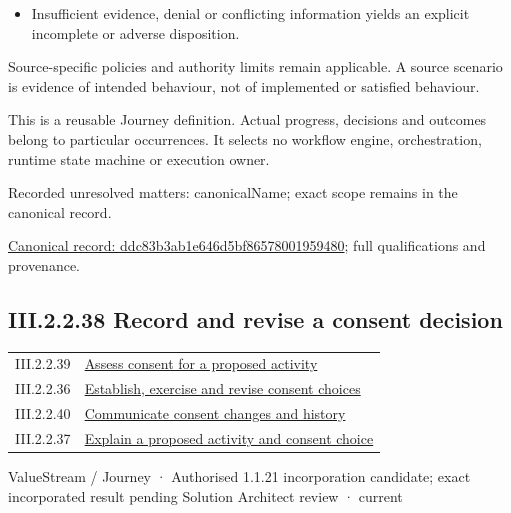 \begin{itemize}


\item Insufficient evidence, denial or conflicting information yields an explicit incomplete or adverse disposition.

\end{itemize}


Source-specific policies and authority limits remain applicable. A source scenario is evidence of intended behaviour, not of implemented or satisfied behaviour.



This is a reusable Journey definition. Actual progress, decisions and outcomes belong to particular occurrences. It selects no workflow engine, orchestration, runtime state machine or execution owner.


{\small Recorded unresolved matters: canonicalName; exact scope remains in the canonical record.}\par
{\footnotesize \href{../../../../../../../continuum/strategy/value-stream/ddc83b3ab1e646d5bf86578001959480.md}{Canonical record: ddc83b3ab1e646d5bf86578001959480}; full qualifications and provenance.}\par
\subsection*{III.2.2.38 Record and revise a consent decision}
\label{navigation:III.2.2.38}

\begin{longtable}{p{.22\linewidth}p{.73\linewidth}}
III.2.2.39 & \hyperref[element:17c66eb17d6040d09e250e787be71719]{Assess consent for a proposed activity} \\
III.2.2.36 & \hyperref[element:850bba32295c4e53b20036b80f77f491]{Establish, exercise and revise consent choices} \\
III.2.2.40 & \hyperref[element:9356b876f2aa427f989ad4f1b7f2fa4c]{Communicate consent changes and history} \\
III.2.2.37 & \hyperref[element:ddc83b3ab1e646d5bf86578001959480]{Explain a proposed activity and consent choice} \\
\end{longtable}
\label{element:74779c85619741d18053a2304457190b}
{\small ValueStream / Journey · Authorised 1.1.21 incorporation candidate; exact incorporated result pending Solution Architect review · current}\par

